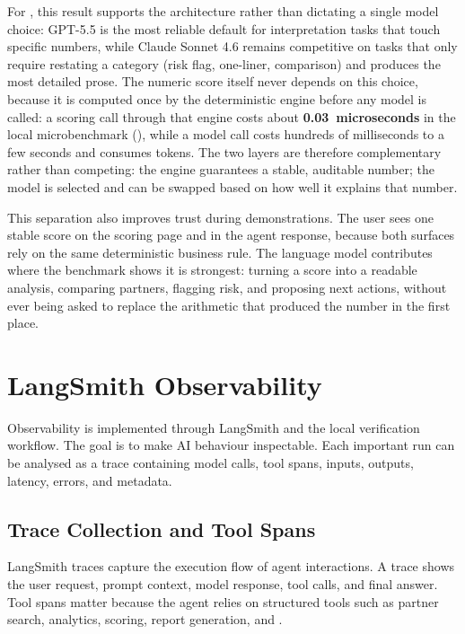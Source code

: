For \projectname{}, this result supports the architecture rather than dictating a single model choice: GPT-5.5 is the most reliable default for interpretation tasks that touch specific numbers, while Claude Sonnet 4.6 remains competitive on tasks that only require restating a category (risk flag, one-liner, comparison) and produces the most detailed prose. The numeric score itself never depends on this choice, because it is computed once by the deterministic engine before any model is called: a scoring call through that engine costs about \textbf{0.03~microseconds} in the local microbenchmark (), while a model call costs hundreds of milliseconds to a few seconds and consumes tokens. The two layers are therefore complementary rather than competing: the engine guarantees a stable, auditable number; the model is selected and can be swapped based on how well it explains that number.

This separation also improves trust during demonstrations. The user sees one stable score on the scoring page and in the agent response, because both surfaces rely on the same deterministic business rule. The language model contributes where the benchmark shows it is strongest: turning a score into a readable analysis, comparing partners, flagging risk, and proposing next actions, without ever being asked to replace the arithmetic that produced the number in the first place.
\section{LangSmith Observability}
\label{sec:chapter7-langsmith-observability}

Observability is implemented through LangSmith and the local verification workflow. The goal is to make AI behaviour inspectable. Each important run can be analysed as a trace containing model calls, tool spans, inputs, outputs, latency, errors, and metadata.

\subsection{Trace Collection and Tool Spans}
\label{subsec:chapter7-traces-tool-spans}

LangSmith traces capture the execution flow of agent interactions. A trace shows the user request, prompt context, model response, tool calls, and final answer. Tool spans matter because the agent relies on structured tools such as partner search, analytics, scoring, report generation, and .

